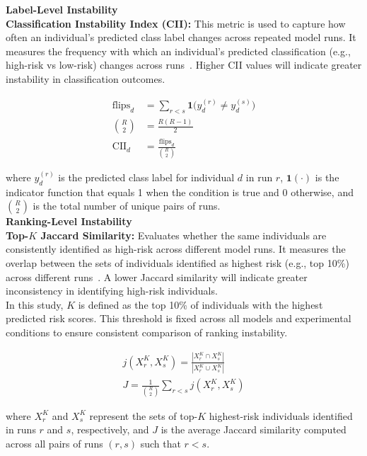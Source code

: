 \documentclass[12pt]{article}
\begin{document}
\textbf{Label-Level Instability} \\
\tab \textbf{Classification Instability Index (CII):} This metric is used to capture how often an individual's predicted class label changes across repeated model runs. It measures the frequency with which an individual's predicted classification (e.g., high-risk vs low-risk) changes across runs~\cite{riley2023stability}. Higher CII values will indicate greater instability in classification outcomes.

\begin{align}
  \text{flips}_d &= \sum_{r<s} \mathbf{1}\big(y_d^{(r)} \ne y_d^{(s)}\big) \\
  \binom{R}{2} &= \frac{R(R-1)}{2} \\
  \text{CII}_d &= \frac{\text{flips}_d}{\binom{R}{2}}
\end{align}

where \( y_d^{(r)} \) is the predicted class label for individual \( d \) in run \( r \), \( \mathbf{1}(\cdot) \) is the indicator function that equals 1 when the condition is true and 0 otherwise, and \( \binom{R}{2} \) is the total number of unique pairs of runs.\\

\textbf{Ranking-Level Instability} \\
\tab \textbf{Top-\(K\) Jaccard Similarity:} Evaluates whether the same individuals are consistently identified as high-risk across different model runs. It measures the overlap between the sets of individuals identified as highest risk (e.g., top 10\%) across different runs~\cite{lopez2022instability}. A lower Jaccard similarity will indicate greater inconsistency in identifying high-risk individuals.\\

In this study, $K$ is defined as the top 10\% of individuals with the highest predicted risk scores. This threshold is fixed across all models and experimental conditions to ensure consistent comparison of ranking instability.

\begin{align}
  j(X_r^K,X_s^K)=\frac{|X_r^K \cap X_s^K|}{|X_r^K \cup X_s^K|} \\
  J=\frac{1}{\binom{R}{2}}\sum_{r<s}j(X_r^K,X_s^K)
\end{align}

where \( X_r^K \) and \( X_s^K \) represent the sets of top-\(K\) highest-risk individuals identified in runs \( r \) and \( s \), respectively, and \( J \) is the average Jaccard similarity computed across all pairs of runs \( (r,s) \) such that \( r < s \).\\
\end{document}
